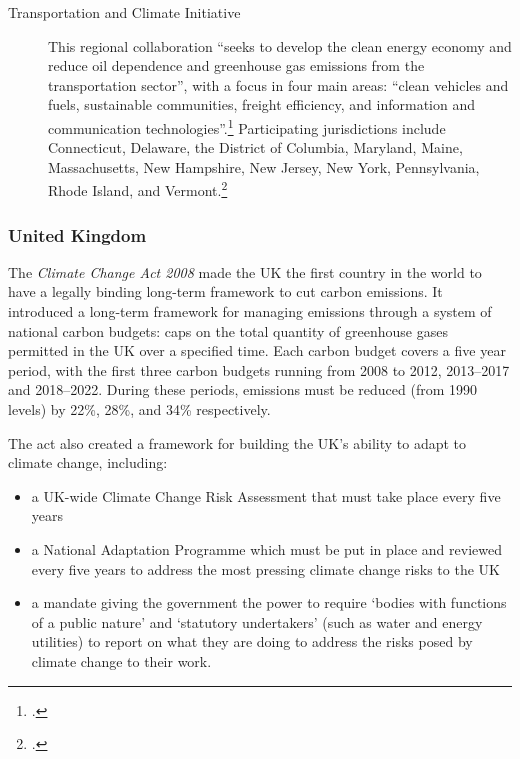 \begin{description}
	\item[Transportation and Climate Initiative] This regional collaboration ``seeks to develop the clean energy economy and reduce oil dependence and greenhouse gas emissions from the transportation sector'', with a focus in four main areas: ``clean vehicles and fuels, sustainable communities, freight efficiency, and information and communication technologies''.\footcite[][]{TranspoClimate} Participating jurisdictions include Connecticut, Delaware, the District of Columbia, Maryland, Maine, Massachusetts, New Hampshire, New Jersey, New York, Pennsylvania, Rhode Island, and Vermont.\footcite[][]{GeorgetownOnTC}
\end{description}



	\subsubsection{United Kingdom}



The \emph{Climate Change Act 2008} made the UK the first country in the world to have a legally binding long-term framework to cut carbon emissions.
It introduced a long-term framework for managing emissions through a system of national carbon budgets: caps on the total quantity of greenhouse gases permitted in the UK over a specified time. 
Each carbon budget covers a five year period, with the first three carbon budgets running from 2008 to 2012, 2013--2017 and 2018--2022.
During these periods, emissions must be reduced (from 1990 levels) by 22\%, 28\%, and 34\% respectively.



The act also created a framework for building the UK's ability to adapt to climate change, including:
\begin{itemize}
	\item a UK-wide Climate Change Risk Assessment that must take place every five years
	\item a National Adaptation Programme which must be put in place and reviewed every five years to address the most pressing climate change risks to the UK
	\item a mandate giving the government the power to require `bodies with functions of a public nature' and `statutory undertakers' (such as water and energy utilities) to report on what they are doing to address the risks posed by climate change to their work.
\end{itemize}


